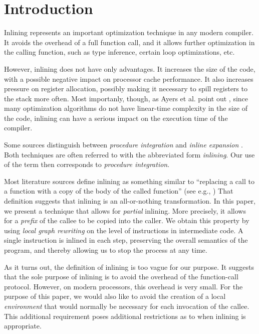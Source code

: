 \section{Introduction}

Inlining represents an important optimization technique in any modern
compiler.  It avoids the overhead of a full function call, and it
allows further optimization in the calling function, such as type
inference, certain loop optimizations, etc.

However, inlining does not have only advantages.  It increases the
size of the code, with a possible negative impact on processor cache
performance.  It also increases pressure on register allocation,
possibly making it necessary to spill registers to the stack more
often.  Most importanly, though, as Ayers et al. point out
\cite{Ayers:1997:AI:258915.258928, Ayers:1997:AI:258916.258928}, since
many optimization algorithms do not have linear-time complexity in the
size of the code, inlining can have a serious impact on the execution
time of the compiler.

Some sources distinguish between \emph{procedure integration} and
\emph{inline expansion} \cite{Muchnick:1998:ACD:286076}.  Both
techniques are often referred to with the abbreviated form
\emph{inlining}.  Our use of the term then corresponds to
\emph{procedure integration}.

Most literature sources define inlining as something similar to
``replacing a call to a function with a copy of the body of the called
function'' (see e.g.,
\cite{Chang:1989:IFE:74818.74840,Chang:1989:IFE:73141.74840,
  Scheifler:1977:AIS:359810.359830}) That definition suggests that
inlining is an all-or-nothing transformation.  In this paper, we
present a technique that allows for \emph{partial} inlining.  More
precisely, it allows for a \emph{prefix} of the callee to be copied
into the caller.  We obtain this property by using \emph{local graph
  rewriting} on the level of instructions in intermediate code.  A
single instruction is inlined in each step, preserving the overall
semantics of the program, and thereby allowing us to stop the process
at any time.

As it turns out, the definition of inlining is too vague for our
purpose.  It suggests that the sole purpose of inlining is to avoid
the overhead of the function-call protocol.  However, on modern
processors, this overhead is very small.  For the purpose of this
paper, we would also like to avoid the creation of a local
\emph{environment} that would normally be necessary for each
invocation of the callee.  This additional requirement poses
additional restrictions as to when inlining is appropriate.

